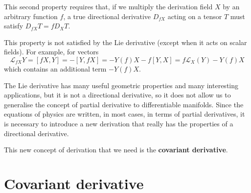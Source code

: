 \begin{points}
\item This second property requires that, if we multiply the derivation field $X$ by an arbitrary function $f$, a true directional derivative $D_{fX}$ acting on a tensor $T$ must satisfy $D_{fX}T=fD_XT$.

\item This property is not satisfied by the Lie derivative (except when it acts on scalar fields). For example, for vectors
\[
  \mathcal L_{fX}Y=[fX,Y]=-[Y,fX]=-Y(f)X-f[Y,X]=f\mathcal L_X(Y)-Y(f)X
\]
which contains an additional term $-Y(f)X$.

\item The Lie derivative has many useful geometric properties and many interesting applications, but it is not a directional derivative, so it does not allow us to generalise the concept of partial derivative to differentiable manifolds. Since the equations of physics are written, in most cases, in terms of partial derivatives, it is necessary to introduce a new derivation that really has the properties of a directional derivative.

\item This new concept of derivation that we need is the \textbf{covariant derivative}.
\end{points}

\section{Covariant derivative}

